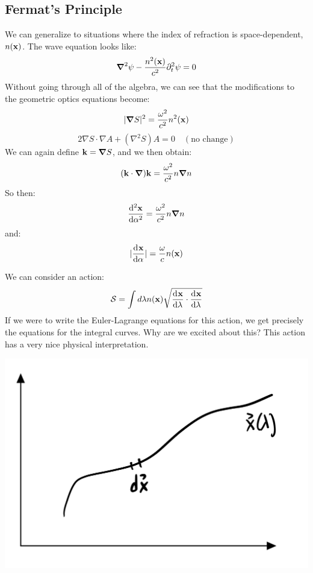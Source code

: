\subsection{Fermat's Principle}
We can generalize to situations where the index of refraction is space-dependent, $n(\mathbf{x})$. The wave equation looks like:
\begin{equation}
    \nabla^2 \psi - \frac{n^2(\v{x})}{c^2}\p_t^2 \psi = 0
\end{equation}
Without going through all of the algebra, we can see that the modifications to the geometric optics equations become:
\begin{equation}
    \abs{\nabla S}^2 = \frac{\omega^2}{c^2}n^2(\v{x})
\end{equation}
\begin{equation}
    2\nabla S \cdot \nabla A + (\nabla^2 S)A = 0 \quad (\text{no change})
\end{equation}
We can again define $\v{k} = \nabla S$, and we then obtain:
\begin{equation}
    (\v{k} \cdot \nabla)\v{k} = \frac{\omega^2}{c^2}n\nabla n
\end{equation}
So then:
\begin{equation}
    \dod[2]{\v{x}}{\alpha} = \frac{\omega^2}{c^2}n\nabla n
\end{equation}
and:
\begin{equation}
    \abs{\dod{\v{x}}{\alpha}} = \frac{\omega}{c}n(\v{x})
\end{equation}

We can consider an action:
\begin{equation}
    \mathcal{S} = \int d\lambda n(\v{x})\sqrt{\dod{\v{x}}{\lambda}\cdot\dod{\v{x}}{\lambda}}
\end{equation}
If we were to write the Euler-Lagrange equations for this action, we get precisely the equations for the integral curves. Why are we excited about this? This action has a very nice physical interpretation.

\begin{center}
    \includegraphics[scale=0.3]{Lectures/Images/lec17-trajectory.png}
\end{center}

